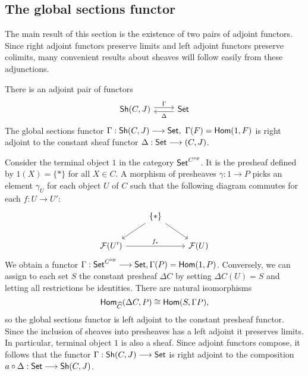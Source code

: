 \subsection{The global sections functor}
The main result of this section is the existence of two pairs of adjoint functors. Since right adjoint functors preserve limits and left adjoint functors preserve colimits, many convenient results about sheaves will follow easily from these adjunctions.
\begin{theorem}
	There is an adjoint pair of functors
	\[
		\begin{tikzcd}
			{\mathsf{Sh}(C,J)} & \Set
			\arrow["\Delta", shift left=1, from=1-2, to=1-1]
			\arrow["\Gamma", shift left=1, from=1-1, to=1-2]
		\end{tikzcd}
	\]
	The global sections functor $\Gamma: \mathsf{Sh}(C,J) \longrightarrow \mathsf{Set},\ \Gamma(F) = \mathsf{Hom}(1,F)$ is right adjoint to the constant sheaf functor $\Delta: \mathsf{Set} \longrightarrow \mathcal{(}C,J)$.
\end{theorem}

Consider the terminal object $1$ in the category $\mathsf{Set}^{C^{op}}$. It is the presheaf defined by $1(X) = \{*\}$ for all $X \in C$. A morphism of presheaves $\gamma: 1 \to P$ picks an element $\gamma_U$ for each object $U$ of $C$ such that the following diagram commutes for each $f: U \to U'$:
\[ \begin{tikzcd}
	& {\{*\}} \\
	{\Sh{F}(U')} && {\Sh{F}(U)}
	\arrow[from=1-2, to=2-1]
	\arrow["{f_*}", from=2-1, to=2-3]
	\arrow[from=1-2, to=2-3]
\end{tikzcd}
\]
We obtain a functor $\Gamma: \mathsf{Set}^{C^{op}} \longrightarrow \mathsf{Set}, \Gamma(P) = \mathsf{Hom}(1, P)$. Conversely, we can assign to each set $S$ the constant presheaf $\Delta C$ by setting $\Delta C(U) = S$ and letting all restrictions be identities. There are natural isomorphisms
\[\mathsf{Hom}_{\widehat{C}}(\Delta C, P) \cong \mathsf{Hom}(S, \Gamma P),\]
so the global sections functor is left adjoint to the constant presheaf functor.
Since the inclusion of sheaves into presheaves has a left adjoint it preserves limits. In particular, terminal object $1$ is also a sheaf. Since adjoint functors compose, it follows that the functor $\Gamma : \mathsf{Sh}(C,J) \longrightarrow \mathsf{Set}$ is right adjoint to the composition $a \circ \Delta: \mathsf{Set} \longrightarrow \mathsf{Sh}(C,J)$. 


